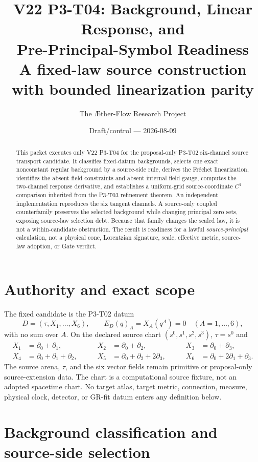 \documentclass[11pt]{article}
\title{V22 P3-T04: Background, Linear Response, and\\
Pre-Principal-Symbol Readiness\\
\large A fixed-law source construction with bounded linearization parity}
\author{The \AE ther-Flow Research Project}
\date{Draft/control --- 2026-08-09}
\begin{document}
\maketitle

\begin{abstract}
This packet executes only V22 P3-T04 for the proposal-only P3-T02 six-channel
source transport candidate.  It classifies fixed-datum backgrounds, selects
one exact nonconstant regular background by a source-side rule, derives the
Fr\'echet linearization, identifies the absent field constraints and absent
internal field gauge, computes the two-channel response derivative, and
establishes a uniform-grid source-coordinate $C^1$ comparison inherited from
the P3-T03 refinement theorem.  An independent implementation reproduces the
six tangent channels.  A source-only coupled counterfamily preserves the
selected background while changing principal zero sets, exposing source-law
selection debt.  Because that family changes the sealed law, it is not a
within-candidate obstruction.  The result is readiness for a lawful
\emph{source-principal} calculation, not a physical cone, Lorentzian
signature, scale, effective metric, source-law adoption, or Gate verdict.
\end{abstract}

\section{Authority and exact scope}

The fixed candidate is the P3-T02 datum
\[
 D=(\tau,X_1,\ldots,X_6),\qquad
 E_D(q)_A=X_A(q^A)=0 \quad(A=1,\ldots,6),
\]
with no sum over $A$.  On the declared source chart
$(s^0,s^1,s^2,s^3)$, $\tau=s^0$ and
\[
\begin{alignedat}{3}
X_1&=\partial_0+\partial_1,\qquad&
X_2&=\partial_0+\partial_2,\qquad&
X_3&=\partial_0+\partial_3,\\
X_4&=\partial_0+\partial_1+\partial_2,\qquad&
X_5&=\partial_0+\partial_2+2\partial_3,\qquad&
X_6&=\partial_0+2\partial_1+\partial_3.
\end{alignedat}
\]
The source arena, $\tau$, and the six vector fields remain primitive or
proposal-only source-extension data.  The chart is a computational source
fixture, not an adopted spacetime chart.  No target atlas, target metric,
connection, measure, physical clock, detector, or GR-fit datum enters any
definition below.

\section{Background classification and source-side selection}
\end{document}
